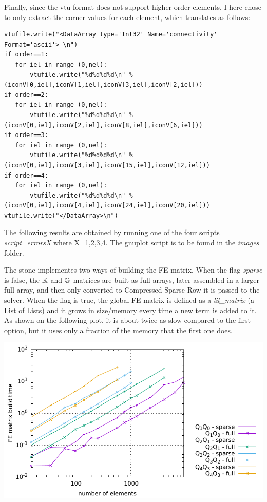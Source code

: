 Finally, since the vtu format does not support higher order elements, I 
here chose to only extract the corner values for each element, 
which translates as follows:
\begin{lstlisting}
vtufile.write("<DataArray type='Int32' Name='connectivity' Format='ascii'> \n")
if order==1:
   for iel in range (0,nel):
       vtufile.write("%d%d%d%d\n" %(iconV[0,iel],iconV[1,iel],iconV[3,iel],iconV[2,iel]))
if order==2:
   for iel in range (0,nel):
       vtufile.write("%d%d%d%d\n" %(iconV[0,iel],iconV[2,iel],iconV[8,iel],iconV[6,iel]))
if order==3:
   for iel in range (0,nel):
       vtufile.write("%d%d%d%d\n" %(iconV[0,iel],iconV[3,iel],iconV[15,iel],iconV[12,iel]))
if order==4:
   for iel in range (0,nel):
       vtufile.write("%d%d%d%d\n" %(iconV[0,iel],iconV[4,iel],iconV[24,iel],iconV[20,iel]))
vtufile.write("</DataArray>\n")
\end{lstlisting}


The following results are obtained by running one of the four scripts {\sl script\_errorsX} 
where X=1,2,3,4. The gnuplot script is to be found in the {\sl images} folder.

The stone implementes two ways of building the FE matrix. When the flag {\sl sparse} 
is false, the ${\mathbb{K}}$ and ${\mathbb{G}}$ matrices are built as full arrays, later assembled in a
larger full array, and then only converted to Compressed Sparse Row 
it is passed to the solver. When the flag is true, the global FE matrix 
is defined as a {\sl lil\_matrix} (a List of Lists) and it grows in size/memory
every time a new term is added to it. As shown on the following plot, it is about 
twice as slow compared to the first option, but it uses only a fraction of the memory
that the first one does. 

\begin{center}
\includegraphics[height=6.cm]{python_codes/fieldstone_48/images/FEMbuildtimes.pdf}
\end{center}

